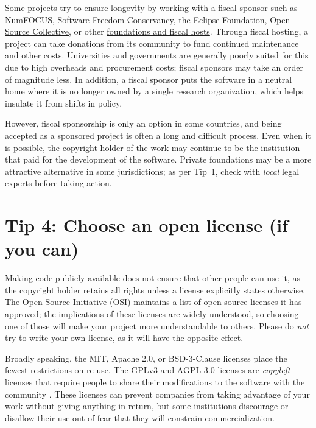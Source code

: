\documentclass[10pt,letterpaper]{article}
\begin{document}
Some projects try to ensure longevity by working with a fiscal sponsor such as
\href{https://numfocus.org/}{NumFOCUS},
\href{https://sfconservancy.org/}{Software Freedom Conservancy},
\href{https://www.eclipse.org/}{the Eclipse Foundation},
\href{https://oscollective.org/}{Open Source Collective},
or other \href{https://sustainoss.org/academic-map/organizations/index.html}{foundations and fiscal hosts}.
Through fiscal hosting,
a project can take donations from its community to fund continued maintenance and other costs.
Universities and governments are generally poorly suited for this due to high overheads and procurement costs;
fiscal sponsors may take an order of magnitude less.
In addition,
a fiscal sponsor puts the software in a neutral home
where it is no longer owned by a single research organization,
which helps insulate it from shifts in policy.

However,
fiscal sponsorship is only an option in some countries,
and being accepted as a sponsored project is often a long and difficult process.
Even when it is possible,
the copyright holder of the work may continue to be the institution that paid for the development of the software.
Private foundations may be a more attractive alternative in some jurisdictions;
as per Tip~1,
check with \emph{local} legal experts before taking action.

\section*{Tip 4: Choose an open license (if you can)}

Making code publicly available does not ensure that other people can use it,
as the copyright holder retains all rights unless a license explicitly states otherwise.
The Open Source Initiative (OSI)
maintains a list of \href{https://opensource.org/licenses}{open source licenses} it has approved;
the implications of these licenses are widely understood,
so choosing one of those will make your project more understandable to others.
Please do \emph{not} try to write your own license,
as it will have the opposite effect.

Broadly speaking,
the MIT, Apache 2.0, or BSD-3-Clause licenses place the fewest restrictions on re-use.
The GPLv3 and AGPL-3.0 licenses are \emph{copyleft} licenses
that require people to share their modifications to the software with the community \cite{Morin2012}.
These licenses can prevent companies from taking advantage of your work without giving anything in return,
but some institutions discourage or disallow their use
out of fear that they will constrain commercialization.
\end{document}
